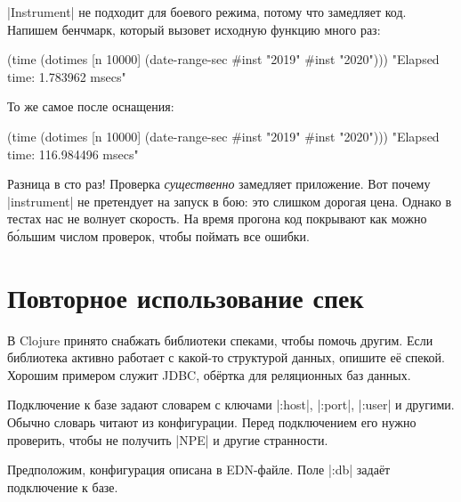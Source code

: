 \spverb|Instrument| не подходит для боевого режима, потому что замедляет
код. Напишем бенчмарк, который вызовет исходную функцию много раз:


\begin{english}
  \begin{clojure}
(time
 (dotimes [n 10000]
   (date-range-sec #inst "2019" #inst "2020")))
"Elapsed time: 1.783962 msecs"
  \end{clojure}
\end{english}

\noindent
То же самое после оснащения:

\begin{english}
  \begin{clojure}
(time
 (dotimes [n 10000]
   (date-range-sec #inst "2019" #inst "2020")))
"Elapsed time: 116.984496 msecs"
  \end{clojure}
\end{english}


Разница в сто раз! Проверка \emph{существенно} замедляет приложение. Вот почему
\spverb|instrument| не претендует на запуск в бою: это слишком дорогая
цена. Однако в тестах нас не волнует скорость. На время прогона код покрывают
как можно б\'{о}льшим числом проверок, чтобы поймать все ошибки.

\section{Повторное использование спек}


В Clojure принято снабжать библиотеки спеками, чтобы помочь другим. Если
библиотека активно работает с какой-то структурой данных, опишите е\"{е}
спекой. Хорошим примером служит JDBC,
об\"{е}ртка для реляционных баз данных.

Подключение к базе задают словарем с ключами \spverb|:host|, \spverb|:port|,
\spverb|:user| и другими. Обычно словарь читают из конфигурации. Перед
подключением его нужно проверить, чтобы не получить \spverb|NPE| и другие
странности.


Предположим, конфигурация описана в EDN-файле. Поле \spverb|:db| зада\"{е}т
подключение к базе.

